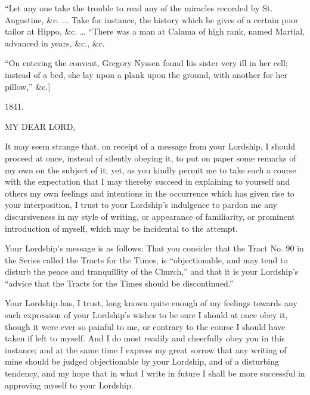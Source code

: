 ``Let any one take the trouble to read any of the
miracles recorded by St. Augustine, \&c. ... Take for instance, the
history which he gives of a certain poor tailor at Hippo, \&c. …
``There was a man at Calama of high rank, named Martial, advanced
in years, \&c., \&c.

``On entering the convent, Gregory Nyssen found
his sister very ill in her cell; instead of a bed, she lay upon a
plank upon the ground, with another for her pillow,'' \&c.]







1841.


MY DEAR
LORD,

It may seem strange that, on receipt of a message from your
Lordship, I should proceed at once, instead of silently obeying it, to
put on paper some remarks of my own on the subject of it; yet, as you
kindly permit me to take such a course with the expectation that I may
thereby succeed in explaining to yourself and others my own feelings
and intentions in the occurrence which has given rise to your
interposition, I trust to your Lordship's indulgence to pardon me any
discursiveness in my style of writing, or appearance of familiarity,
or prominent introduction of myself, which may be incidental to the
attempt.

Your Lordship's message is as follows: That you
consider that the Tract No. 90 in the Series called the Tracts for the
Times, is ``objectionable, and may tend to disturb the peace and
tranquillity of the Church,'' and that it is your Lordship's ``advice
that the Tracts for the Times should be discontinued.''

Your Lordship has, I trust, long known quite
enough of my feelings towards any such expression of your Lordship's
wishes to be sure I should at once obey it, though it were ever so
painful to me, or contrary to the course I should have taken if left
to myself. And I do most readily and cheerfully obey you in this
instance; and at the same time I express my great sorrow that any
writing of mine should be judged objectionable by your Lordship, and
of a disturbing tendency, and my hope that in what I write in future I
shall be more successful in approving myself to your Lordship.

